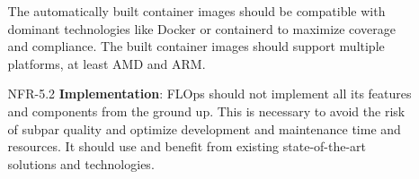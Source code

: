 \begin{itemize}
\begin{itemize}
                The automatically built container images should be compatible with dominant technologies like Docker or containerd to maximize coverage and compliance.
                The built container images should support multiple platforms, at least AMD and ARM.
            \item [NFR-5.2] {\textbf{Implementation}}:
                FLOps should not implement all its features and components from the ground up.
                This is necessary to avoid the risk of subpar quality and optimize development and maintenance time and resources.
                It should use and benefit from existing state-of-the-art solutions and technologies.
        \end{itemize}
\end{itemize}